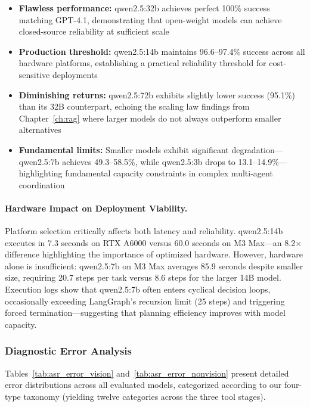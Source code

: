 \begin{itemize}[leftmargin=*]
    \item \textbf{Flawless performance:} qwen2.5:32b achieves perfect 100\% success matching GPT-4.1, demonstrating that open-weight models can achieve closed-source reliability at sufficient scale
    \item \textbf{Production threshold:} qwen2.5:14b maintains 96.6--97.4\% success across all hardware platforms, establishing a practical reliability threshold for cost-sensitive deployments
    \item \textbf{Diminishing returns:} qwen2.5:72b exhibits slightly lower success (95.1\%) than its 32B counterpart, echoing the scaling law findings from Chapter~\ref{ch:rag} where larger models do not always outperform smaller alternatives
    \item \textbf{Fundamental limits:} Smaller models exhibit significant degradation---qwen2.5:7b achieves 49.3--58.5\%, while qwen2.5:3b drops to 13.1--14.9\%---highlighting fundamental capacity constraints in complex multi-agent coordination
\end{itemize}

\paragraph{Hardware Impact on Deployment Viability.} Platform selection critically affects both latency and reliability. qwen2.5:14b executes in 7.3 seconds on RTX A6000 versus 60.0 seconds on M3 Max---an 8.2$\times$ difference highlighting the importance of optimized hardware. However, hardware alone is insufficient: qwen2.5:7b on M3 Max averages 85.9 seconds despite smaller size, requiring 20.7 steps per task versus 8.6 steps for the larger 14B model. Execution logs show that qwen2.5:7b often enters cyclical decision loops, occasionally exceeding LangGraph's recursion limit (25 steps) and triggering forced termination---suggesting that planning efficiency improves with model capacity.

\subsubsection{Diagnostic Error Analysis}

Tables~\ref{tab:asr_error_vision} and~\ref{tab:asr_error_nonvision} present detailed error distributions across all evaluated models, categorized according to our four-type taxonomy (yielding twelve categories across the three tool stages).

